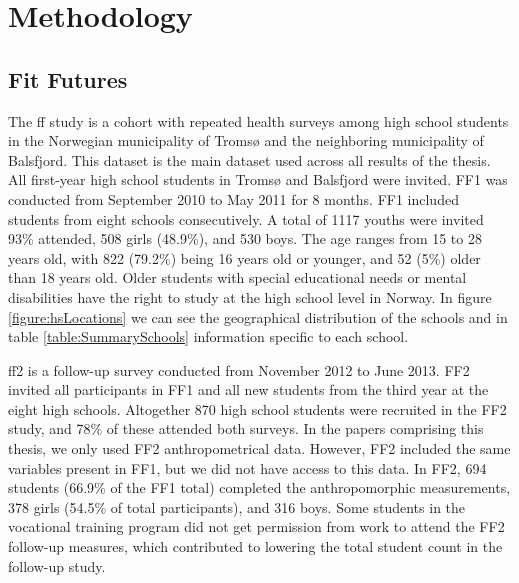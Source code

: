 \chapter{Methodology}\label{ch:methodology}

\section{Fit Futures}

The \gls{ff} study \cite{ffreference} is a cohort with repeated health surveys among high school students in the Norwegian municipality of Tromsø and the neighboring municipality of Balsfjord. This dataset is the main dataset used across all results of the thesis. All first-year high school students in Tromsø and Balsfjord were invited. FF1 was conducted from September 2010 to May 2011 for 8 months. FF1 included students from eight schools consecutively. A total of 1117 youths were invited 93\% attended, 508 girls (48.9\%), and 530 boys. The age ranges from 15 to 28 years old, with 822 (79.2\%) being 16 years old or younger, and 52 (5\%) older than 18 years old. Older students with special educational needs or mental disabilities have the right to study at the high school level in Norway. In figure \ref{figure:hsLocations} we can see the geographical distribution of the schools and in table \ref{table:SummarySchools} information specific to each school.

\gls{ff2} is a follow-up survey conducted from November 2012 to June 2013. FF2 invited all participants in FF1 and all new students from the third year at the eight high schools. Altogether 870 high school students were recruited in the FF2 study, and 78\% of these attended both surveys. In the papers comprising this thesis, we only used FF2 anthropometrical data. However, FF2 included the same variables present in FF1, but we did not have access to this data. In FF2, 694 students (66.9\% of the FF1 total) completed the anthropomorphic measurements, 378 girls (54.5\% of total participants), and 316 boys. Some students in the vocational training program did not get permission from work to attend the FF2 follow-up measures, which contributed to lowering the total student count in the follow-up study.


